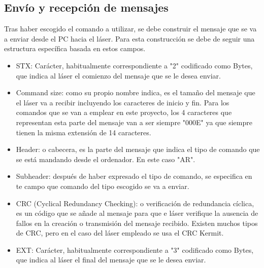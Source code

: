  \subsection{Envío y recepción de mensajes}
 Tras haber escogido el comando a utilizar, se debe construir el mensaje que se va a enviar desde el PC hacia el láser. Para esta construcción se debe de seguir una estructura específica basada en estos campos.\\
 \begin{itemize}
 	\item STX: Carácter, habitualmente correspondiente a "2" codificado como Bytes, que indica al láser el comienzo del mensaje que se le desea enviar.
 	\item Command size: como su propio nombre indica, es el tamaño del mensaje que el láser va a recibir incluyendo los caracteres de inicio y fin. Para los comandos que se van a emplear en este proyecto, los 4 caracteres que representan esta parte del mensaje van a ser siempre "000E" ya que siempre tienen la misma extensión de 14 caracteres.
 	\item Header: o cabecera, es la parte del mensaje que indica el tipo de comando que se está mandando desde el ordenador. En este caso "AR".
 	\item Subheader: después de haber expresado el tipo de comando, se especifica en te campo que comando del tipo escogido se va a enviar.
 	\item CRC (Cyclical Redundancy Checking):  o verificación de redundancia cíclica, es un código que se añade al mensaje para que e láser verifique la ausencia de fallos en la creación o transmisión del mensaje recibido. Existen muchos tipos de CRC, pero en el caso del láser empleado se usa el CRC Kermit.
 	\item EXT: Carácter, habitualmente correspondiente a "3" codificado como Bytes, que indica al láser el final del mensaje que se le desea enviar.
 \end{itemize}
 
